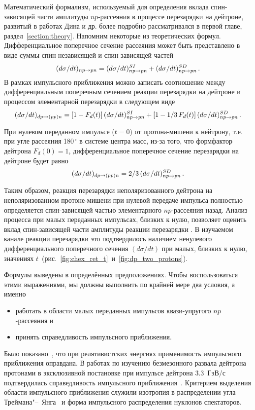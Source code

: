 Математический формализм, используемый для определения вклада спин-зависящей
части амплитуды $np$-рассеяния в процессе перезарядки на дейтроне, развитый в
работах Дина и др. более подробно рассматривался в первой главе,
раздел~\ref{section:theory}. Напомним некоторые из теоретических формул.
Дифференциальное поперечное сечение \np рассеяния может быть представлено в виде
суммы спин-независящей и спин-зависящей частей
\begin{equation}
  \label{eq:np}
  (d\sigma/dt)_{np \rightarrow pn} = (d\sigma/dt)^{SI}_{np \rightarrow pn} + (d\sigma/dt)^{SD}_{np \rightarrow pn}\,.
\end{equation}
В рамках импульсного приближения можно записать соотношение между
дифференциальным поперечным сечением реакции перезарядки на дейтроне \dpchex и
процессом элементарной перезарядки \np в следующем виде
\begin{equation}
  \label{eq:dpnp}
  (d\sigma/dt)_{dp \rightarrow (pp)n} = [1-F_d(t)]\,(d\sigma/dt)^{SI}_{np \rightarrow pn} +
  [1-1/3\,F_d(t)]\,(d\sigma/dt)^{SD}_{np \rightarrow pn}\,.
\end{equation}

При нулевом переданном импульсе ($t=0$) от протона-мишени к нейтрону, т.е. при
угле рассеяния 180$^{\,\circ}$ в системе центра масс, из-за того, что формфактор
дейтрона $F_d(0) = 1$, дифференциальное поперечное сечение перезарядки на
дейтроне будет равно
\begin{equation}
  \label{eq:dpnp0}
  (d\sigma/dt)_{dp \rightarrow (pp)n} = 2/3\,(d\sigma/dt)^{SD}_{np \rightarrow pn}\,.
\end{equation}

Таким образом, реакция перезарядки неполяризованного дейтрона на
неполяризованном протоне-мишени при нулевой передаче импульса полностью
определяется спин-зависящей частью элементарного $np$-рассеяния назад. Анализ
процесса \dpchex при малых переданных импульсах, близких к нулю, позволяет
оценить вклад спин-зависящей части амплитуды реакции перезарядки \np. В
изучаемом канале реакции перезарядки это подтвердилось наличием ненулевого
дифференциального поперечного сечения $(d\sigma/dt)$ при малых, близких к нулю,
значениях $t$~(рис.~\ref{fig:chex_ret_t}~и~\ref{fig:dp_two_protons}).

Формулы выведены в определённых предположениях. Чтобы воспользоваться этими
выражениями, мы должны выполнить по крайней мере два условия, а именно
\begin{itemize}
\item работать в области малых переданных импульсов квази-упругого
  $np$-рассеяния и
\item принять справедливость импульсного приближения.
\end{itemize}
Было показано~\cite{glagolev99,led04}, что при релятивистских энергиях
применимость импульсного приближения оправдана. В работах по изучению
безмезонного развала дейтрона протонами в эксклюзивной постановке при импульсе
дейтрона 3.3~ГэВ/с подтвердилась справедливость импульсного
приближения~\cite{alad75_4,alad77_2,glagolev73}. Критерием выделения
области импульсного приближения служили изотропия в распределении угла
Треймана"--~Янга~\cite{trei62} и форма импульсного распределения нуклонов
спектаторов.

